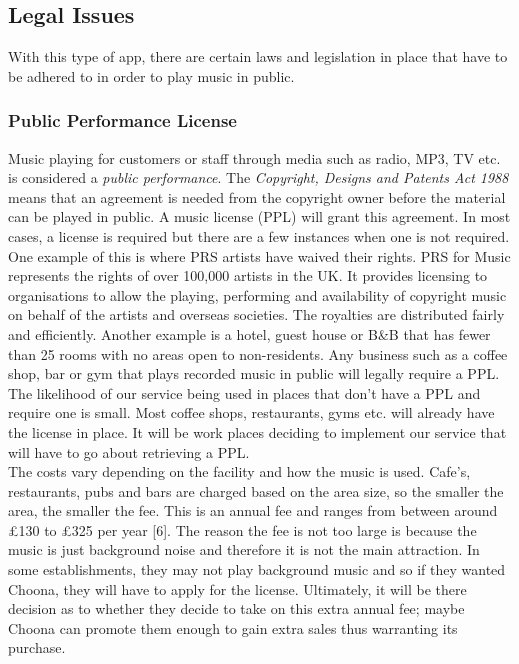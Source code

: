 \subsection{\textbf{Legal Issues}}
With this type of app, there are certain laws and legislation in place that have to be adhered to in order to play music in public.  
\subsubsection{Public Performance License}
    Music playing for customers or staff through media such as radio, MP3, TV etc. is considered a \emph{public performance}. The \emph{Copyright, Designs and Patents Act 1988} means that an agreement is needed from the copyright owner before the material can be played in public. A music license (PPL) will grant this agreement. In most cases, a license is required but there are a few instances when one is not required. One example of this is where PRS  artists have waived their rights. PRS for Music represents the rights of over 100,000 artists in the UK.  It provides licensing to organisations to allow the playing, performing and availability of copyright music on behalf of the artists and overseas societies.  The royalties are distributed fairly and efficiently.  Another example is a hotel, guest house or B\&B that has fewer than 25 rooms with no areas open to non-residents. 
    Any business such as a coffee shop, bar or gym that plays recorded music in public will legally require a PPL. The likelihood of our service being used in places that don't have a PPL and require one is small.  Most coffee shops, restaurants, gyms etc. will already have the license in place.  It will be work places deciding to implement our service that will have to go about retrieving a PPL.\\
The costs vary depending on the facility and how the music is used.  Cafe's, restaurants, pubs and bars are charged based on the area size, so the smaller the area, the smaller the fee.  This is an annual fee and ranges from between around £130 to £325 per year [6].  The reason the fee is not too large is because the music is just background noise and therefore it is not the main attraction.  In some establishments, they may not play background music and so if they wanted Choona, they will have to apply for the license.  Ultimately, it will be there decision as to whether they decide to take on this extra annual fee; maybe Choona can promote them enough to gain extra sales thus warranting its purchase.    \\
